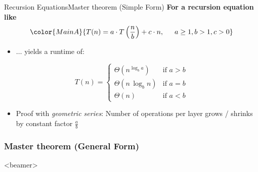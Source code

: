 
\begin{frame}{Recursion Equations}{Master theorem (Simple Form)}
  \textbf{For a recursion equation like}
  \begin{displaymath}
    \color{MainA}{%
      T(n) = a \cdot T\left(\frac{n}{b}\right) + c \cdot n,%
      \hspace{1.5em}a \geq 1, b > 1, c > 0%
    }%
  \end{displaymath}
  \vspace{-1.0em}
  \begin{itemize}
    \item<2->
      $\ldots$ yields a runtime of:
  \end{itemize}
  \begin{displaymath}
    T(n) = \begin{cases}
      \Theta(n^{\log_b a}) & \text{if } a > b\\
      \Theta(n \, \log_b n) & \text{if } a = b\\
      \Theta(n) & \text{if } a < b
    \end{cases}
  \end{displaymath}
  \begin{itemize}
    \item<4->
      Proof with \textit{geometric series}:
      Number of operations per layer grows / shrinks by constant factor
      $\tfrac{a}{b}$
  \end{itemize}
\end{frame}


\subsubsection{Master theorem (General Form)}

\begin{frame}<beamer>{\LectureToC}
  \tableofcontents[currentsection,
    currentsubsection,
    subsubsectionstyle=show/shaded/shaded/shaded]
\end{frame}

